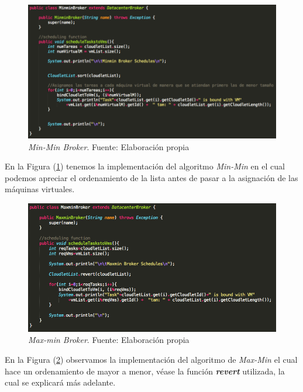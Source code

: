 \setcounter{figure}{12}
\renewcommand\thefigure{\arabic{figure}}
\begin{figure}[h!]
	\centering
	\includegraphics[scale=0.5]{media/minmin_broker}
	\caption{\textit{Min-Min Broker}. Fuente: Elaboración propia}
	\label{fig:minminBroker}
\end{figure}

\newpage

En la Figura (\ref{fig:minminBroker}) tenemos la implementaci\'on del algoritmo \textit{Min-Min} en el cual podemos apreciar el ordenamiento de la lista antes de pasar a  la asignaci\'on de las m\'aquinas virtuales.

\newpage
\setcounter{figure}{13}
\renewcommand\thefigure{\arabic{figure}}
\begin{figure}[h!]
	\centering
	\includegraphics[scale=0.5]{media/maxmin_broker}
	\caption{\textit{Max-min Broker}. Fuente: Elaboración propia}
	\label{fig:maxminBroker}
\end{figure}

En la Figura (\ref{fig:maxminBroker}) observamos la implementaci\'on del algoritmo de \textit{Max-Min} el cual hace un ordenamiento de mayor a menor, v\'ease la funci\'on \textbf{\textit{revert}} utilizada, la cual se explicar\'a m\'as adelante.

